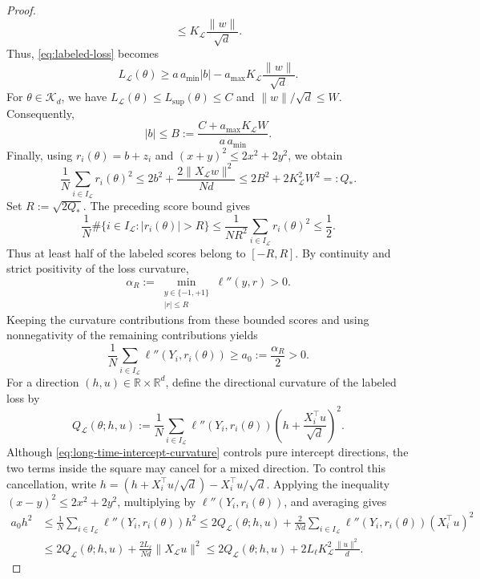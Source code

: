 \begin{proof}
\[    \leq K_{\mathcal L}\frac{\|w\|}{\sqrt d}.
\]
Thus, \eqref{eq:labeled-loss} becomes
\[
    L_{\mathcal L}(\theta)
    \geq a\,a_{\min}|b|
        -a_{\max}K_{\mathcal L}\frac{\|w\|}{\sqrt d}.
\]
For $\theta\in\mathcal K_d$, we have
$L_{\mathcal L}(\theta)\leq L_{\mathrm{sup}}(\theta)\leq C$
and $\|w\|/\sqrt d\leq W$. Consequently,
\[
    |b|
    \leq B:=
    \frac{C+a_{\max}K_{\mathcal L}W}{a\,a_{\min}}.
\]
Finally, using $r_i(\theta)=b+z_i$ and
$(x+y)^2\leq2x^2+2y^2$, we obtain
\[
    \frac1N\sum_{i\in I_{\mathcal L}}r_i(\theta)^2
    \leq 2b^2+\frac{2\|X_{\mathcal L}w\|^2}{Nd}
    \leq 2B^2+2K_{\mathcal L}^2W^2
    =:Q_*.
\]
Set $R:=\sqrt{2Q_*}$. The preceding score bound gives
\[
    \frac1N
    \#\{i\in I_{\mathcal L}:|r_i(\theta)|>R\}
    \leq
    \frac1{NR^2}\sum_{i\in I_{\mathcal L}}r_i(\theta)^2
    \leq\frac12.
\]
Thus at least half of the labeled scores belong to $[-R,R]$.
By continuity and strict positivity of the loss curvature,
\[
    \alpha_R:=
    \min_{\substack{y\in\{-1,+1\}\\|r|\leq R}}
        \ell''(y,r)>0.
\]
Keeping the curvature contributions from these bounded scores
and using nonnegativity of the remaining contributions yields
\begin{equation}
    \frac1N\sum_{i\in I_{\mathcal L}}
        \ell''(Y_i,r_i(\theta))
    \geq a_0:=\frac{\alpha_R}{2}>0.
    \label{eq:long-time-intercept-curvature}
\end{equation}
For a direction $(h,u)\in\mathbb R\times\mathbb R^d$, define
the directional curvature of the labeled loss by
\[
    Q_{\mathcal L}(\theta;h,u)
    :=
    \frac1N\sum_{i\in I_{\mathcal L}}
        \ell''(Y_i,r_i(\theta))
        \left(h+\frac{X_i^\top u}{\sqrt d}\right)^2.
\]
Although \eqref{eq:long-time-intercept-curvature} controls
pure intercept directions, the two terms inside the square
may cancel for a mixed direction. To control this cancellation,
write
$h=
    \left(h+{X_i^\top u}/{\sqrt d}\right)
    -{X_i^\top u}/{\sqrt d}$.
Applying the inequality $(x-y)^2\leq2x^2+2y^2$, multiplying by
$\ell''(Y_i,r_i(\theta))$, and averaging gives
\begin{align*}
    a_0h^2
    &\leq
    \frac1N\sum_{i\in I_{\mathcal L}}
        \ell''(Y_i,r_i(\theta))h^2
    \leq
    2Q_{\mathcal L}(\theta;h,u)
    +\frac2{Nd}\sum_{i\in I_{\mathcal L}}
        \ell''(Y_i,r_i(\theta))(X_i^\top u)^2\\
    &\leq
    2Q_{\mathcal L}(\theta;h,u)
    +\frac{2L_\ell}{Nd}\|X_{\mathcal L}u\|^2
    \leq
    2Q_{\mathcal L}(\theta;h,u)
    +2L_\ell K_{\mathcal L}^2\frac{\|u\|^2}{d}.

\end{align*}
\end{proof}
